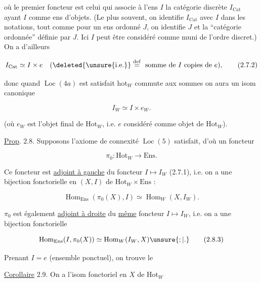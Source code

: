 où le premier foncteur est celui qui associe à l'ens $I$ la catégorie discrète $I_{\mathrm{Cat}}$ ayant $I$ comme ens d'objets. (Le plus souvent, on identifie $I_{\mathrm{Cat}}$ avec $I$ dans les notations, tout comme pour un ens ordonné $J$, on identifie $J$ et la ``catégorie ordonnée'' définie par $J$. Ici $I$ peut être considéré comme muni de l'ordre discret.) On a d'ailleurs

\[
 I_{\mathrm{Cat}}\simeq I\times e\quad (\deleted{\unsure{\mathrm{i.e.}}}\overset{\mathrm{def}}{=}\text{ somme de }I\text{ copies de }e),
 \tag*{(2.7.2)}
\]

donc quand  $\operatorname{Loc}(4a)$ est satisfait  $\mathrm{hot}_W$ commute aux sommes  on aura un isom canonique

\[
 I_W\simeq I\times e_W. \tag*{(2.7.3.)}
\]

(où $e_W$ est l'objet final de $\mathrm{Hot}_W$, i.e. $e$ considéré comme objet de $\mathrm{Hot}_W$).

\uline{Prop}. 2.8. Supposons  l'axiome  de connexité $\operatorname{Loc}(5)$ satisfait, d'où un foncteur

\[
 \pi_0:\mathrm{Hot}_W\longrightarrow\mathrm{Ens}. \tag*{(2.8.1)}
\]

Ce foncteur est \uline{adjoint à gauche} du foncteur $I\mapsto I_W$ (2.7.1), i.e. on a une bijection fonctorielle en $(X,I)$ de $\mathrm{Hot}_W\times\mathrm{Ens}$ :



\[
 \operatorname{Hom}_{\mathrm{Ens}}(\pi_0(X),I)\simeq\operatorname{Hom}_W(X,I_W).
 \tag*{(2.8.2)}
\]

  $\pi_0$ est également \uline{adjoint à droite} du \uline{même} foncteur $I\mapsto I_W$, i.e. on a une bijection fonctorielle

\[
 \operatorname{Hom}_{\mathrm{Ens}}(I,\pi_0(X))\simeq\operatorname{Hom}_W(I_W,X)\unsure{;|.}
 \tag*{(2.8.3)}
\]

Prenant $I=e$ (ensemble ponctuel), on trouve le 

\uline{Corollaire} 2.9.  On a  l'isom fonctoriel en $X$ de $\mathrm{Hot}_W$

